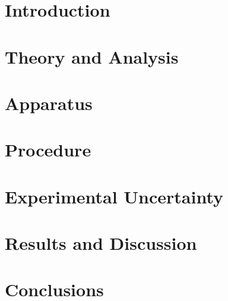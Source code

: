 \documentclass[12pt]{article}
\begin{document}



\newpage


\section{Introduction} \label{sec:1}

\clearpage
\section{Theory and Analysis} \label{sec:2}

\clearpage
\section{Apparatus} \label{sec:3}

\clearpage
\section{Procedure} \label{sec:4}

\clearpage
\section{Experimental Uncertainty} \label{sec:5}

\clearpage
\section{Results and Discussion} \label{sec:6}

\clearpage
\section{Conclusions} \label{sec:7}


\clearpage
\label{sec:8}
\begin{thebibliography}{9}

\end{thebibliography}
\end{document}
